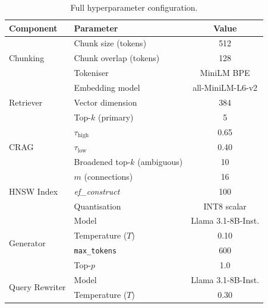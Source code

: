 \documentclass[10pt, twocolumn]{article}
\begin{document}
\begin{table}[H]
  \centering
  \caption{Full hyperparameter configuration.}
  \label{tab:hyperparams}
  \begin{tabular}{@{}llc@{}}
    \toprule
    \textbf{Component}     & \textbf{Parameter}               & \textbf{Value} \\
    \midrule
    \multirow{3}{*}{Chunking}
                           & Chunk size (tokens)              & 512  \\
                           & Chunk overlap (tokens)           & 128  \\
                           & Tokeniser                        & MiniLM BPE \\
    \midrule
    \multirow{3}{*}{Retriever}
                           & Embedding model                  & all-MiniLM-L6-v2 \\
                           & Vector dimension                 & 384  \\
                           & Top-$k$ (primary)                & 5    \\
    \midrule
    \multirow{3}{*}{CRAG}
                           & $\tau_{\text{high}}$             & 0.65 \\
                           & $\tau_{\text{low}}$              & 0.40 \\
                           & Broadened top-$k$ (ambiguous)   & 10   \\
    \midrule
    \multirow{3}{*}{HNSW Index}
                           & $m$ (connections)                & 16   \\
                           & \textit{ef\_construct}           & 100  \\
                           & Quantisation                     & INT8 scalar \\
    \midrule
    \multirow{4}{*}{Generator}
                           & Model                            & Llama 3.1-8B-Inst. \\
                           & Temperature ($T$)                & 0.10 \\
                           & \texttt{max\_tokens}             & 600  \\
                           & Top-$p$                          & 1.0  \\
    \midrule
    \multirow{2}{*}{Query Rewriter}
                           & Model                            & Llama 3.1-8B-Inst. \\
                           & Temperature ($T$)                & 0.30 \\
    \bottomrule
  \end{tabular}
\end{table}
\end{document}

